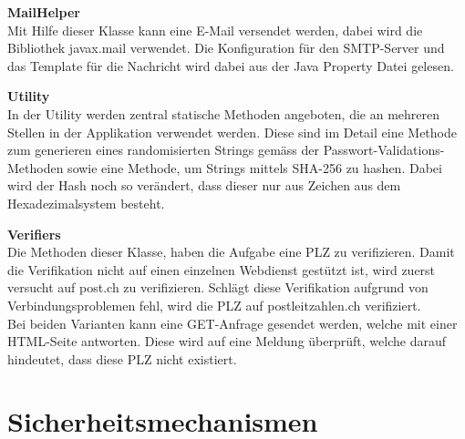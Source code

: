 \documentclass[12pt]{scrartcl}
\begin{document}
\textbf{MailHelper}\\
Mit Hilfe dieser Klasse kann eine E-Mail versendet werden, dabei wird die Bibliothek javax.mail verwendet. Die Konfiguration für den SMTP-Server und das Template für die Nachricht wird dabei aus der Java Property Datei gelesen.

\textbf{Utility}\\
In der Utility werden zentral statische Methoden angeboten, die an mehreren Stellen in der Applikation verwendet werden. Diese sind im Detail eine Methode zum generieren eines randomisierten Strings gemäss der Passwort-Validations-Methoden sowie eine Methode, um Strings mittels SHA-256 zu hashen. Dabei wird der Hash noch so verändert, dass dieser nur aus Zeichen aus dem Hexadezimalsystem besteht.

\textbf{Verifiers}\\
Die Methoden dieser Klasse, haben die Aufgabe eine PLZ zu verifizieren. Damit die Verifikation nicht auf einen einzelnen Webdienst gestützt ist, wird zuerst versucht auf post.ch zu verifizieren. Schlägt diese Verifikation aufgrund von Verbindungsproblemen fehl, wird die PLZ auf postleitzahlen.ch verifiziert.\\
Bei beiden Varianten kann eine GET-Anfrage gesendet werden, welche mit einer HTML-Seite antworten. Diese wird auf eine Meldung überprüft, welche darauf hindeutet, dass diese PLZ nicht existiert.

\section{Sicherheitsmechanismen}
\end{document}
